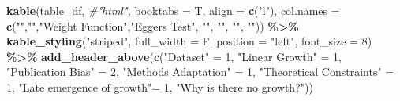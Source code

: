 \documentclass[
]{article}
\newenvironment{Shaded}{\begin{snugshade}}{\end{snugshade}}
\newcommand{\AttributeTok}[1]{\textcolor[rgb]{0.13,0.29,0.53}{#1}}
\newcommand{\CommentTok}[1]{\textcolor[rgb]{0.56,0.35,0.01}{\textit{#1}}}
\newcommand{\DecValTok}[1]{\textcolor[rgb]{0.00,0.00,0.81}{#1}}
\newcommand{\FunctionTok}[1]{\textcolor[rgb]{0.13,0.29,0.53}{\textbf{#1}}}
\newcommand{\NormalTok}[1]{#1}
\newcommand{\OtherTok}[1]{\textcolor[rgb]{0.56,0.35,0.01}{#1}}
\newcommand{\SpecialCharTok}[1]{\textcolor[rgb]{0.81,0.36,0.00}{\textbf{#1}}}
\newcommand{\StringTok}[1]{\textcolor[rgb]{0.31,0.60,0.02}{#1}}
\begin{document}
\begin{Shaded}
\begin{Highlighting}[]
  
\FunctionTok{kable}\NormalTok{(table\_df,}
      \CommentTok{\#"html",}
      \AttributeTok{booktabs =}\NormalTok{ T,}
      \AttributeTok{align =} \FunctionTok{c}\NormalTok{(}\StringTok{"l"}\NormalTok{),}
      \AttributeTok{col.names =} \FunctionTok{c}\NormalTok{(}\StringTok{""}\NormalTok{,}\StringTok{""}\NormalTok{,}\StringTok{"Weight Function"}\NormalTok{,}\StringTok{"Egger\textquotesingle{}s Test"}\NormalTok{, }\StringTok{""}\NormalTok{, }\StringTok{""}\NormalTok{, }\StringTok{""}\NormalTok{, }\StringTok{""}\NormalTok{)) }\SpecialCharTok{\%\textgreater{}\%}
  \FunctionTok{kable\_styling}\NormalTok{(}\StringTok{"striped"}\NormalTok{, }\AttributeTok{full\_width =}\NormalTok{ F,}
                \AttributeTok{position =} \StringTok{"left"}\NormalTok{, }\AttributeTok{font\_size =} \DecValTok{8}\NormalTok{) }\SpecialCharTok{\%\textgreater{}\%} 
  \FunctionTok{add\_header\_above}\NormalTok{(}\FunctionTok{c}\NormalTok{(}\StringTok{"Dataset"} \OtherTok{=} \DecValTok{1}\NormalTok{, }\StringTok{"Linear Growth"} \OtherTok{=} \DecValTok{1}\NormalTok{, }\StringTok{"Publication Bias"} \OtherTok{=} \DecValTok{2}\NormalTok{, }
                   \StringTok{"Methods Adaptation"} \OtherTok{=} \DecValTok{1}\NormalTok{, }\StringTok{"Theoretical Constraints"} \OtherTok{=} \DecValTok{1}\NormalTok{, }\StringTok{"Late emergence of growth"}\OtherTok{=} \DecValTok{1}\NormalTok{, }\StringTok{"Why is there no growth?"}\NormalTok{))  }
\end{Highlighting}
\end{Shaded}

\begingroup\fontsize{8}{10}\selectfont
\end{document}
